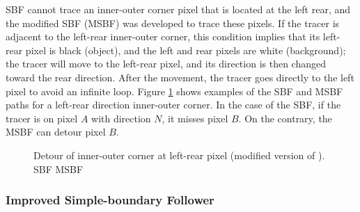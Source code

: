 SBF cannot trace an inner-outer corner pixel that is located at the left rear, and the modified SBF (MSBF)\cite{Gose1996Pattern} was developed to trace these pixels. If the tracer is adjacent to the left-rear inner-outer corner, this condition implies that its left-rear pixel is black (object), and the left and rear pixels are white (background); the tracer will move to the left-rear pixel, and its direction is then changed toward the rear direction. After the movement, the tracer goes directly to the left pixel to avoid an infinite loop. Figure \ref{fig:image3} shows examples of the SBF and MSBF paths for a left-rear direction inner-outer corner. In the case of the SBF, if the tracer is on pixel $A$ with direction $N$, it misses pixel $B$. On the contrary, the MSBF can detour pixel $B$.

\begin{figure}[htbp]
	\centering
	 
	\caption{Detour of inner-outer corner at left-rear pixel (modified version of \cite{Gose1996Pattern}). \protect{} SBF \protect{} MSBF}
	\label{fig:image3}
\end{figure}

\subsubsection{Improved Simple-boundary Follower}


